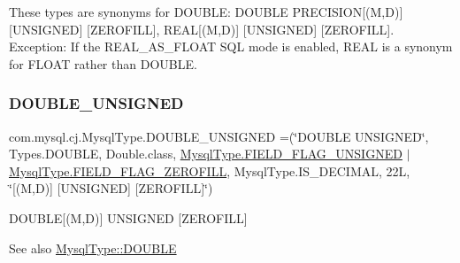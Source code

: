These types are synonyms for D\+O\+U\+B\+LE\+: D\+O\+U\+B\+LE P\+R\+E\+C\+I\+S\+I\+ON\mbox{[}(M,D)\mbox{]} \mbox{[}U\+N\+S\+I\+G\+N\+ED\mbox{]} \mbox{[}Z\+E\+R\+O\+F\+I\+LL\mbox{]}, R\+E\+AL\mbox{[}(M,D)\mbox{]} \mbox{[}U\+N\+S\+I\+G\+N\+ED\mbox{]} \mbox{[}Z\+E\+R\+O\+F\+I\+LL\mbox{]}. Exception\+: If the R\+E\+A\+L\+\_\+\+A\+S\+\_\+\+F\+L\+O\+AT S\+QL mode is enabled, R\+E\+AL is a synonym for F\+L\+O\+AT rather than D\+O\+U\+B\+LE. \mbox{\label{enumcom_1_1mysql_1_1cj_1_1_mysql_type_a9ca99746f8ab3f53a3b0b9ad9599f5c0}} 
\subsubsection{\texorpdfstring{D\+O\+U\+B\+L\+E\+\_\+\+U\+N\+S\+I\+G\+N\+ED}{DOUBLE\_UNSIGNED}}
{\footnotesize\ttfamily com.\+mysql.\+cj.\+Mysql\+Type.\+D\+O\+U\+B\+L\+E\+\_\+\+U\+N\+S\+I\+G\+N\+ED =(\char`\"{}D\+O\+U\+B\+LE U\+N\+S\+I\+G\+N\+ED\char`\"{}, Types.\+D\+O\+U\+B\+LE, Double.\+class, \mbox{\hyperlink{enumcom_1_1mysql_1_1cj_1_1_mysql_type_a2c6701614559b1ad9955cdc4ca6337e2}{Mysql\+Type.\+F\+I\+E\+L\+D\+\_\+\+F\+L\+A\+G\+\_\+\+U\+N\+S\+I\+G\+N\+ED}} $\vert$ \mbox{\hyperlink{enumcom_1_1mysql_1_1cj_1_1_mysql_type_abb76a1f2f3dac9a30d1b559b8ba66a48}{Mysql\+Type.\+F\+I\+E\+L\+D\+\_\+\+F\+L\+A\+G\+\_\+\+Z\+E\+R\+O\+F\+I\+LL}}, Mysql\+Type.\+I\+S\+\_\+\+D\+E\+C\+I\+M\+AL, 22\+L, \char`\"{}\mbox{[}(\+M,\+D)\mbox{]} \mbox{[}\+U\+N\+S\+I\+G\+N\+E\+D\mbox{]} \mbox{[}\+Z\+E\+R\+O\+F\+I\+L\+L\mbox{]}\char`\"{})}

D\+O\+U\+B\+LE\mbox{[}(M,D)\mbox{]} U\+N\+S\+I\+G\+N\+ED \mbox{[}Z\+E\+R\+O\+F\+I\+LL\mbox{]}

\begin{DoxySeeAlso}{See also}
\mbox{\hyperlink{enumcom_1_1mysql_1_1cj_1_1_mysql_type_a3f95bc5758ff4e4f6ce9cd1fb1889400}{Mysql\+Type\+::\+D\+O\+U\+B\+LE}} 
\end{DoxySeeAlso}
\mbox{\label{enumcom_1_1mysql_1_1cj_1_1_mysql_type_a6173f156b78f3888f9c2073ccd3fda1a}} 
